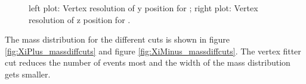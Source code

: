 		\begin{figure}
			\caption{left plot: Vertex resolution of y position for \anticascade; right plot: Vertex resolution of z position for \anticascade.}
			\label{fig:xi_vtxres_yz}
			
		\end{figure}
	
		The mass distribution for the different cuts is shown in figure \ref{fig:XiPlus_massdiffcuts} and figure \ref{fig:XiMinus_massdiffcuts}. 
		The vertex fitter cut reduces the number of events most and the width of the mass distribution gets smaller.
		
